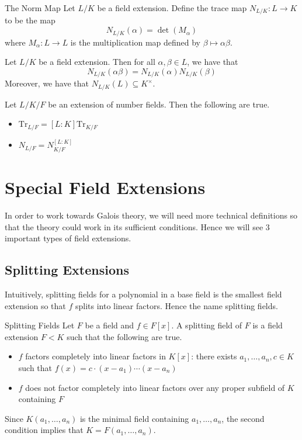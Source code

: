 \documentclass[a4paper]{article}
\begin{document}
\begin{defn}{The Norm Map}{} Let $L/K$ be a field extension. Define the trace map $N_{L/K}:L\to K$ to be the map $$N_{L/K}(\alpha)=\det(M_\alpha)$$ where $M_\alpha:L\to L$ is the multiplication map defined by $\beta\mapsto\alpha\beta$. 
\end{defn}

\begin{lmm}{}{} Let $L/K$ be a field extension. Then for all $\alpha,\beta\in L$, we have that $$N_{L/K}(\alpha\beta)=N_{L/K}(\alpha)N_{L/K}(\beta)$$ Moreover, we have that $N_{L/K}(L)\subseteq K^\times$. 
\end{lmm}

\begin{crl}{}{} Let $L/K/F$ be an extension of number fields. Then the following are true. 
\begin{itemize}
\item $\text{Tr}_{L/F}=[L:K]\text{Tr}_{K/F}$
\item $N_{L/F}=N_{K/F}^{[L:K]}$
\end{itemize}
\end{crl}

\pagebreak
\section{Special Field Extensions}
In order to work towards Galois theory, we will need more technical definitions so that the theory could work in its sufficient conditions. Hence we will see $3$ important types of field extensions. 

\subsection{Splitting Extensions}
Intuitively, splitting fields for a polynomial in a base field is the smallest field extension so that $f$ splits into linear factors. Hence the name splitting fields. 

\begin{defn}{Splitting Fields}{} Let $F$ be a field and $f\in F[x]$. A splitting field of $F$ is a field extension $F<K$ such that the following are true. 
\begin{itemize}
\item $f$ factors completely into linear factors in $K[x]$: there exists $a_1,\dots,a_n,c\in K$ such that $f(x)=c\cdot (x-a_1)\cdots(x-a_n)$
\item $f$ does not factor completely into linear factors over any proper subfield of $K$ containing $F$
\end{itemize}
Since $K(a_1,\dots,a_n)$ is the minimal field containing $a_1,\dots,a_n$, the second condition implies that $K=F(a_1,\dots,a_n)$. 
\end{defn}
\end{document}
